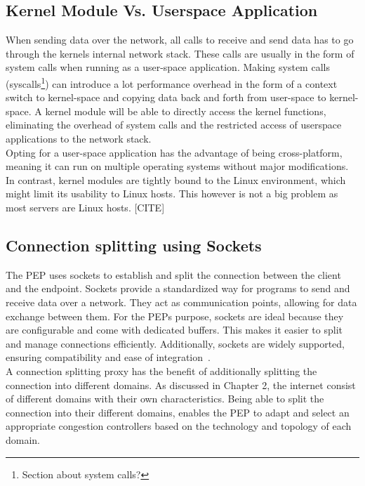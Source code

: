 \documentclass[a4paper,english, 11pt]{report}
\begin{document}
\subsection{Kernel Module Vs. Userspace Application}
When sending data over the network, all calls to receive and send data has to go through the kernels internal network stack. These calls are usually in the form of system calls when running as a user-space application. Making system calls (syscalls\footnote{Section about system calls?}) can introduce a lot performance overhead in the form of a context switch to kernel-space and copying data back and forth from user-space to kernel-space. A kernel module will be able to directly access the kernel functions, eliminating the overhead of system calls and the restricted access of userspace applications to the network stack.\\

Opting for a user-space application has the advantage of being cross-platform, meaning it can run on multiple operating systems without major modifications. In contrast, kernel modules are tightly bound to the Linux environment, which might limit its usability to Linux hosts. This however is not a big problem as most servers are Linux hosts. [CITE]

\subsection{Connection splitting using Sockets}%
The PEP uses sockets to establish and split the connection between the client and the endpoint. Sockets provide a standardized way for programs to send and receive data over a network. They act as communication points, allowing for data exchange between them. For the PEPs purpose, sockets are ideal because they are configurable and come with dedicated buffers. This makes it easier to split and manage connections efficiently. Additionally, sockets are widely supported, ensuring compatibility and ease of integration~\cite{ibm_doc}.\\

A connection splitting proxy has the benefit of additionally splitting the connection into different domains. As discussed in Chapter 2, the internet consist of different domains with their own characteristics. Being able to split the connection into their different domains, enables the PEP to adapt and select an appropriate congestion controllers based on the technology and topology of each domain.\\
\end{document}
